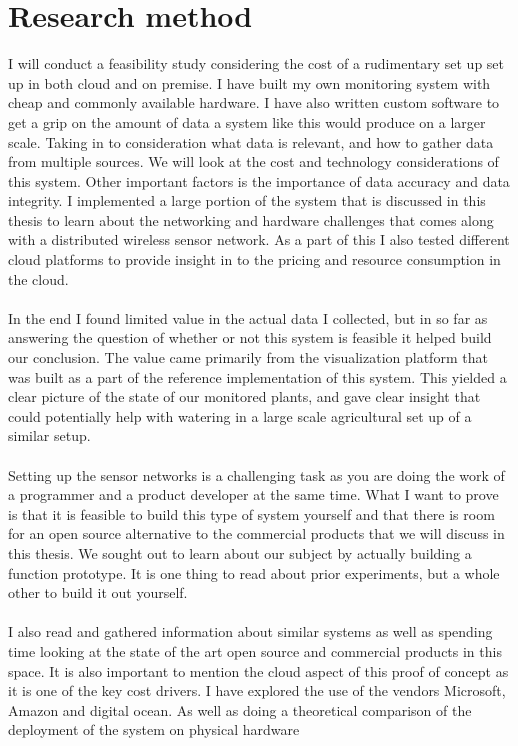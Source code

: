 \documentclass[]{uiophd}
\begin{document}
\section{Research method}
 I will conduct a feasibility study considering the cost of a rudimentary set up set up in both cloud and on premise. I have built my own monitoring system with cheap and commonly available hardware. I have also written custom software to get a grip on the amount of data a system like this would produce on a larger scale. Taking in to consideration what data is relevant, and how to gather data from multiple sources. We will look at the cost and technology considerations of this system. Other important factors is the importance of data accuracy and data integrity. I implemented a large portion of the system that is discussed in this thesis to learn about the networking and hardware challenges that comes along with a distributed wireless sensor network. As a part of this I also tested different cloud platforms to provide insight in to the pricing and resource consumption in the cloud. 
\\\\
In the end I found limited value in the actual data I collected, but in so far as answering the question of whether or not this system is feasible it helped build our conclusion. The value came primarily from the visualization platform that was built as a part of the reference implementation of this system. This yielded a clear picture of the state of our monitored plants, and gave clear insight that could potentially help with watering in a large scale agricultural set up of a similar setup.
\\\\
Setting up the sensor networks is a challenging task as you are doing the work of a programmer and a product developer at the same time. What I want to prove is that it is feasible to build this type of system yourself and that there is room for an open source alternative to the commercial products that we will discuss in this thesis. We sought out to learn about our subject by actually building a function prototype. It is one thing to read about prior experiments, but a whole other to build it out yourself.
\\\\
I also read and gathered information about similar systems as well as spending time looking at the state of the art open source and commercial products in this space. It is also important to mention the cloud aspect of this proof of concept as it is one of the key cost drivers. I have explored the use of the vendors Microsoft, Amazon and digital ocean. As well as doing a theoretical comparison of the deployment of the system on physical hardware
\end{document}
